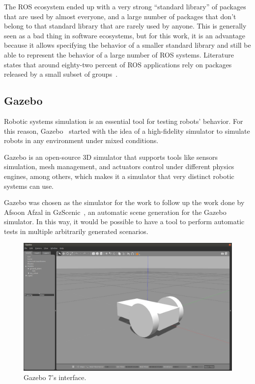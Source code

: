 The ROS ecosystem ended up with a very strong \enquote{standard library} of packages that are used by almost everyone, and a large number of packages that don't belong to that standard library that are rarely used by anyone. This is generally seen as a bad thing in software ecosystems, but for this work, it is an advantage because it allows specifying the behavior of a smaller standard library and still be able to represent the behavior of a large number of ROS systems. Literature states that around eighty-two percent of ROS applications rely on packages released by a small subset of groups~\cite{9240632}.


\subsection{Gazebo}
\label{ssec:gazebo}

Robotic systems simulation is an essential tool for testing robots' behavior. For this reason, Gazebo~\cite{koenig2004design} started with the idea of a high-fidelity simulator to simulate robots in any environment under mixed conditions.

Gazebo is an open-source 3D simulator that supports tools like sensors simulation, mesh management, and actuators control under different physics engines, among others, which makes it a simulator that very distinct robotic systems can use.

Gazebo was chosen as the simulator for the work to follow up the work done by Afsoon Afzal in GzScenic~\cite{AfzalGzScenic}, an automatic scene generation for the Gazebo simulator. In this way, it would be possible to have a tool to perform automatic tests in multiple arbitrarily generated scenarios.

\begin{figure}[htb]
\includegraphics[width=\textwidth]{images/Gazebo_7_interface_mobile_base.png}
\caption{Gazebo 7's interface.} \label{fig:gazeboInterface}
\end{figure}

